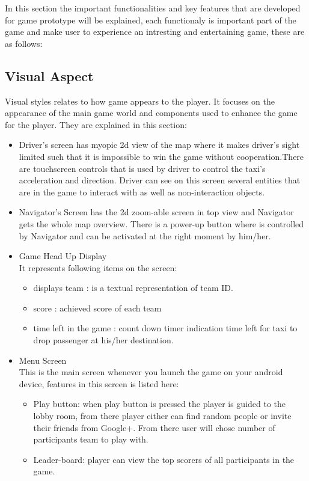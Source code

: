 In this section the important functionalities and key features that are developed for game prototype will be explained, each functionaly is important part of the game and make user to experience an intresting and entertaining game, these are as follows:

\subsection*{Visual Aspect} %
\label{sub:visual_aspect}
Visual styles relates to how game appears to the player. It focuses on the appearance of the main game world and components used to enhance the game for the player. They are explained in this section:
\begin{itemize}
		\item Driver's screen has myopic 2d view of the map where it makes driver's sight limited such that it is impossible to win the game without cooperation.There are touchscreen controls that is used by driver to control the taxi's acceleration and direction. Driver can see on this screen several entities that are in the game to interact with as well as non-interaction objects.   
		\item Navigator's Screen has the 2d zoom-able screen in top view and Navigator gets the whole map overview. There is a power-up button where is controlled by Navigator and can be activated at the right moment by him/her.
		\item Game Head Up Display\\
		It represents following items on the screen: 
			\begin{itemize}
				\item displays team : is a textual representation of team ID. 
				\item score : achieved score of each team 
				\item time left in the game : count down timer indication time left for taxi to drop passenger at his/her destination.
			\end{itemize}	
		\item Menu Screen\\
			This is the main screen whenever you launch the game on your android device, features in this screen is listed here:
			\begin{itemize}
				\item Play button: when play button is pressed the player is guided to the lobby room, from there player either can find random people or invite their friends from Google+. From there user will chose number of participants team to play with. 
				\item Leader-board: player can view the top scorers of all participants in the game.
			\end{itemize}	
\end{itemize}

